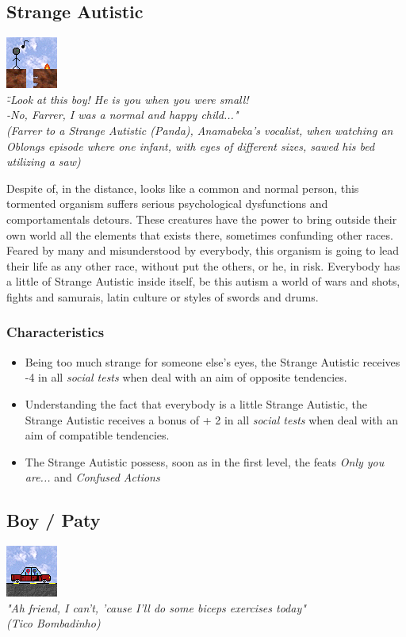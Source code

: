 \documentclass[ letterpaper,12pt]{article}
\begin{document}
\subsection{Strange Autistic}
\includegraphics{../data/races/Img/autista.png}\\
{\it \" -Look at this boy! He is you when you were small!\\
 -No, Farrer, I was a normal and happy child..."\\
(Farrer to a Strange Autistic (Panda), Anamabeka's vocalist, when watching an Oblongs episode where one infant, with eyes of different sizes, sawed his bed utilizing a saw)\\}

Despite of, in the distance, looks like a common and normal person, this
tormented organism suffers serious psychological dysfunctions and
comportamentals detours. These creatures have the power to bring outside their
own world all the elements that exists there, sometimes confunding other races.
Feared by many and misunderstood by everybody, this organism is going to lead
their life as any other race, without put the others, or he, in risk.
Everybody has a little of Strange Autistic inside itself, be this autism a
world of wars and shots, fights and samurais, latin culture or styles of swords
and drums.

\subsubsection{Characteristics}
\begin{itemize}
\item{Being too much strange for someone else's eyes, the Strange Autistic receives -4 in all {\it social tests} when deal with an aim of opposite tendencies.}
\item{Understanding the fact that everybody is a little Strange Autistic, the Strange Autistic receives a bonus of + 2 in all {\it social tests} when deal with an aim of compatible tendencies.}
\item{The Strange Autistic possess, soon as in the first level, the feats {\it Only you are...} and {\it Confused Actions}}
\end{itemize}

\subsection{Boy / Paty}
\includegraphics{../data/races/Img/boy.png}\\
{\it "Ah friend, I can't, 'cause I'll do some biceps exercises today"\\
(Tico Bombadinho)\\}
\end{document}
